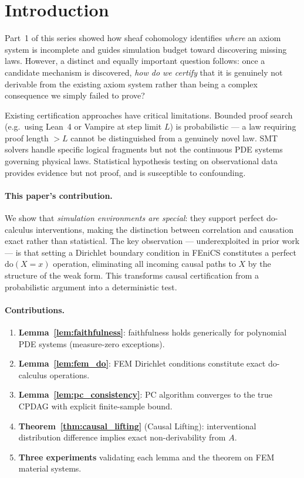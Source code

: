 \documentclass[twoside,11pt]{article}
\newcommand{\doOp}{\mathrm{do}}
\begin{document}
\section{Introduction}
\label{sec:intro}

Part~1 of this series \citep{forgwm2026part1} showed how sheaf
cohomology identifies \emph{where} an axiom system is incomplete and
guides simulation budget toward discovering missing laws. However, a
distinct and equally important question follows: once a candidate
mechanism is discovered, \emph{how do we certify} that it is genuinely
not derivable from the existing axiom system rather than being a
complex consequence we simply failed to prove?

Existing certification approaches have critical limitations. Bounded
proof search (e.g.\ using Lean~4 or Vampire at step limit $L$) is
probabilistic --- a law requiring proof length $> L$ cannot be
distinguished from a genuinely novel law. SMT solvers handle specific
logical fragments but not the continuous PDE systems governing physical
laws. Statistical hypothesis testing on observational data provides
evidence but not proof, and is susceptible to confounding.

\paragraph{This paper's contribution.}
We show that \emph{simulation environments are special}: they support
perfect do-calculus interventions, making the distinction between
correlation and causation exact rather than statistical. The key
observation --- underexploited in prior work --- is that setting a
Dirichlet boundary condition in FEniCS constitutes a perfect
$\doOp(X=x)$ operation, eliminating all incoming causal paths to $X$
by the structure of the weak form. This transforms causal certification
from a probabilistic argument into a deterministic test.

\paragraph{Contributions.}
\begin{enumerate}[label=(\roman*)]
\item \textbf{Lemma~\ref{lem:faithfulness}}: faithfulness holds
  generically for polynomial PDE systems (measure-zero exceptions).
\item \textbf{Lemma~\ref{lem:fem_do}}: FEM Dirichlet conditions
  constitute exact do-calculus operations.
\item \textbf{Lemma~\ref{lem:pc_consistency}}: PC algorithm converges
  to the true CPDAG with explicit finite-sample bound.
\item \textbf{Theorem~\ref{thm:causal_lifting}} (Causal Lifting):
  interventional distribution difference implies exact
  non-derivability from $A$.
\item \textbf{Three experiments} validating each lemma and the theorem
  on FEM material systems.
\end{enumerate}
\end{document}
